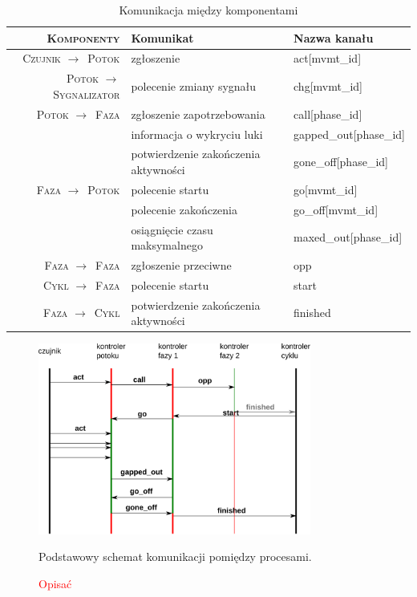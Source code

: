 \documentclass{pracamgr}
\newcommand{\todo}[1]{\textcolor{red}{#1}}
\newcommand{\rarr}{$\rightarrow$}
\theoremstyle{plain}
\begin{document}
\renewcommand{\arraystretch}{1.4}
\begin{table}[h]
  \centering
  \begin{tabular}{>{\scshape}r|p{}|>{\ttfamily}p{}}
    \firsthline\firsthline
    \textbf{Komponenty} & \textbf{Komunikat} & \textnormal{\bfseries Nazwa kanału} \\ \hline
    Czujnik \rarr\ Potok & zgłoszenie & act[mvmt\_id] \\ \hline
    Potok \rarr\ Sygnalizator & polecenie zmiany sygnału & chg[mvmt\_id]
    \\ \hline
    Potok \rarr\ Faza & zgłoszenie zapotrzebowania & call[phase\_id] \\
                      & informacja o wykryciu luki & gapped\_out[phase\_id] \\
                      & potwierdzenie zakończenia aktywności & gone\_off[phase\_id]
    \\ \hline
    Faza \rarr\ Potok & polecenie startu & go[mvmt\_id] \\
                      & polecenie zakończenia & go\_off[mvmt\_id] \\
                      & osiągnięcie czasu maksymalnego & maxed\_out[phase\_id]
    \\ \hline
    Faza \rarr\ Faza & zgłoszenie przeciwne & opp
    \\ \hline
    Cykl \rarr\ Faza & polecenie startu & start \\ \hline
    Faza \rarr\ Cykl & potwierdzenie zakończenia aktywności & finished \\
    \hline\hline
  \end{tabular}
  \caption{Komunikacja między komponentami}
  \label{tab:models:channels}
\end{table}

\begin{figure}[h]
  \centering
  \includegraphics[width=0.8\textwidth]{img/models-msc}
  \caption{Podstawowy schemat komunikacji pomiędzy procesami.}
  \caption*{\todo{Opisać}}
  \label{img:models:msc}
\end{figure}
\end{document}
